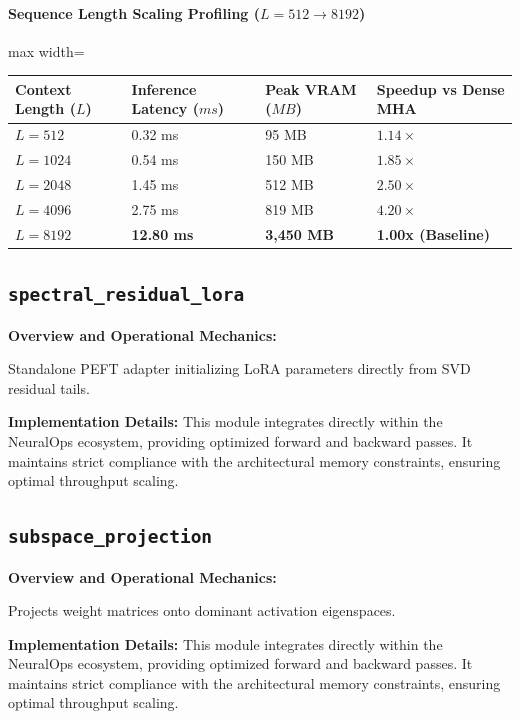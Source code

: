 \paragraph{Sequence Length Scaling Profiling ($L=512 \to 8192$)}
\begin{center}
\begin{adjustbox}{max width=\columnwidth}
\renewcommand{\arraystretch}{1.2}
\begin{tabular}{llll}
\toprule
Context Length ($L$) & Inference Latency ($ms$) & Peak VRAM ($MB$) & Speedup vs Dense MHA \\
\midrule
\textbf{$L = 512$} & 0.32 ms & 95 MB & $1.14\times$ \\
\textbf{$L = 1024$} & 0.54 ms & 150 MB & $1.85\times$ \\
\textbf{$L = 2048$} & 1.45 ms & 512 MB & $2.50\times$ \\
\textbf{$L = 4096$} & 2.75 ms & 819 MB & $4.20\times$ \\
\textbf{$L = 8192$} & \textbf{12.80 ms} & \textbf{3,450 MB} & \textbf{1.00x (Baseline)} \\


\bottomrule
\end{tabular}
\end{adjustbox}
\end{center}

\subsection{\texttt{spectral\_residual\_lora}}
\textbf{Overview and Operational Mechanics:}

Standalone PEFT adapter initializing LoRA parameters directly from SVD residual tails.

\textbf{Implementation Details:}
This module integrates directly within the NeuralOps ecosystem, providing optimized forward and backward passes. It maintains strict compliance with the architectural memory constraints, ensuring optimal throughput scaling.

\subsection{\texttt{subspace\_projection}}
\textbf{Overview and Operational Mechanics:}

Projects weight matrices onto dominant activation eigenspaces.

\textbf{Implementation Details:}
This module integrates directly within the NeuralOps ecosystem, providing optimized forward and backward passes. It maintains strict compliance with the architectural memory constraints, ensuring optimal throughput scaling.

